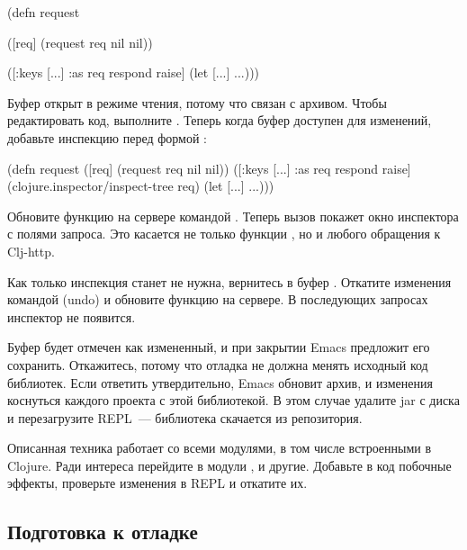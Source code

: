 \begin{english}
  \begin{clojure}
(defn request

  ([req]
   (request req nil nil))

  ([{:keys [...] :as req} respond raise]
   (let [...]
     ...)))
  \end{clojure}
\end{english}

Буфер  открыт в режиме чтения, потому что связан с архивом. Чтобы редактировать код, выполните . Теперь когда буфер доступен для изменений, добавьте инспекцию перед формой  :

\pagebreaklarge

\begin{english}
  \begin{clojure/lines}
(defn request
  ([req] (request req nil nil))
  ([{:keys [...]
     :as req} respond raise]
   (clojure.inspector/inspect-tree req)
   (let [...]
     ...)))
  \end{clojure/lines}
\end{english}

Обновите функцию на сервере командой . Теперь вызов  покажет окно инспектора с полями запроса. Это касается не только функции , но и любого обращения к Clj-http.

Как только инспекция станет не нужна, вернитесь в буфер . Откатите изменения командой  (undo) и обновите функцию на сервере. В последующих запросах инспектор не появится.

Буфер  будет отмечен как измененный, и при закрытии Emacs предложит его сохранить. Откажитесь, потому что отладка не должна менять исходный код библиотек. Если ответить утвердительно, Emacs обновит архив, и изменения коснуться каждого проекта с этой библиотекой. В этом случае удалите jar с диска и перезагрузите REPL~--- библиотека скачается из репозитория.

Описанная техника работает со всеми модулями, в том числе встроенными в Clojure. Ради интереса перейдите в модули ,  и другие. Добавьте в код побочные эффекты, проверьте изменения в REPL и откатите их.

\subsection{Подготовка к отладке}

